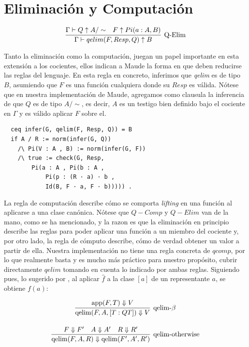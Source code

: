 \section{Eliminación y Computación}
\begin{gather}
  \infer[\text{Q-Elim}]
  {\Gamma \vdash qelim(F, Resp, Q) \uparrow B}
  {\Gamma \vdash Q \uparrow A/\sim & F \uparrow Pi(a : A, B)}
\end{gather}

Tanto la eliminación como la computación, juegan un papel importante en esta extensión a los cocientes, ellos indican a Maude la forma en que deben reducirse las reglas del lenguaje. En esta regla en concreto, inferimos que \textit{qelim} es de tipo $B$, asumiendo que $F$ es una función cualquiera donde su $Resp$ es válida. Nótese que en nuestra implementación de Maude, agregamos como clausula la inferencia de que $Q$ es de tipo $A/\sim$, es decir, $A$ es un testigo bien definido bajo el cociente en $\Gamma$ y es válido aplicar $F$ sobre el.
\begin{lstlisting}
  ceq infer(G, qelim(F, Resp, Q)) = B
  if A / R := norm(infer(G, Q))
    /\ Pi(V : A , B) := norm(infer(G, F))
    /\ true := check(G, Resp,
        Pi(a : A , Pi(b : A ,
            Pi(p : (R · a) · b ,
            Id(B, F · a, F · b))))) .
\end{lstlisting}

La regla de computación describe cómo se comporta \textit{lifting} en una función al aplicarse a una clase canónica. Nótese que $Q-Comp$ y $Q-Elim$ van de la mano, como se ha mencionado, y la razon es que la eliminación en principio describe las reglas para poder aplicar una función a un miembro del cociente y, por otro lado, la regla de cómputo describe, cómo de verdad obtener un valor a partir de ella. Nuestra implementación no tiene una regla concreta de $qcomp$, por lo que realmente basta y es mucho más práctico para nuestro propósito, cubrir directamente $qelim$ tomando en cuenta lo indicado por ambas reglas. Siguiendo pues, lo sugerido por \cite{nuoli}, al aplicar $\hat{f}$ a la clase $[a]$ de un representante $a$, se obtiene $f(a)$:


\begin{gather*}
  \infer[\text{qelim-}\beta]
  {\mathrm{qelim}(F, A, [T : QT]) \Downarrow V}
  {\mathrm{app}(F, T) \Downarrow V}
  \\[1em]
  \infer[\text{qelim-otherwise}]
  {\mathrm{qelim}(F, A, R) \Downarrow \mathrm{qelim}(F', A', R')}
  {F \Downarrow F' \quad A \Downarrow A' \quad R \Downarrow R'}
\end{gather*}

